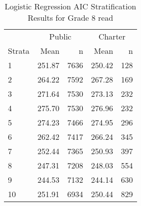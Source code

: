 \begin{table}[ht]
\centering
\caption{Logistic Regression AIC Stratification Results for Grade 8 read} 
\label{g8read-circpsa10AIC}
\begin{tabular}{lrr@{\extracolsep{.2cm}}rr}
  \hline
   & \multicolumn{2}{c}{Public} & \multicolumn{2}{c}{Charter} \\ \cline{2-3} \cline{4-5} Strata & Mean & n & Mean & n \\ \hline
1 & 251.87 & 7636 & 250.42 & 128 \\ 
  2 & 264.22 & 7592 & 267.28 & 169 \\ 
  3 & 271.64 & 7530 & 273.13 & 232 \\ 
  4 & 275.70 & 7530 & 276.96 & 232 \\ 
  5 & 274.23 & 7466 & 274.95 & 296 \\ 
  6 & 262.42 & 7417 & 266.24 & 345 \\ 
  7 & 252.44 & 7365 & 250.93 & 397 \\ 
  8 & 247.31 & 7208 & 248.03 & 554 \\ 
  9 & 244.53 & 7132 & 244.14 & 630 \\ 
  10 & 251.91 & 6934 & 250.44 & 829 \\ 
   \hline
\end{tabular}
\end{table}
